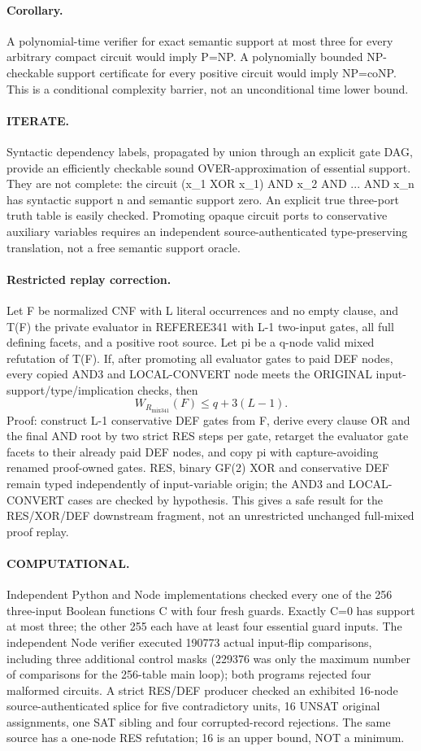 \documentclass[11pt]{article}
\begin{document}
\paragraph{Corollary.} A polynomial-time verifier for exact semantic support at most three for every arbitrary compact circuit would imply P=NP. A polynomially bounded NP-checkable support certificate for every positive circuit would imply NP=coNP. This is a conditional complexity barrier, not an unconditional time lower bound.
\paragraph{ITERATE.} Syntactic dependency labels, propagated by union through an explicit gate DAG, provide an efficiently checkable sound OVER-approximation of essential support. They are not complete: the circuit (x_1 XOR x_1) AND x_2 AND ... AND x_n has syntactic support n and semantic support zero. An explicit true three-port truth table is easily checked. Promoting opaque circuit ports to conservative auxiliary variables requires an independent source-authenticated type-preserving translation, not a free semantic support oracle.
\paragraph{Restricted replay correction.} Let F be normalized CNF with L literal occurrences and no empty clause, and T(F) the private evaluator in REFEREE341 with L-1 two-input gates, all full defining facets, and a positive root source. Let pi be a q-node valid mixed refutation of T(F). If, after promoting all evaluator gates to paid DEF nodes, every copied AND3 and LOCAL-CONVERT node meets the ORIGINAL input-support/type/implication checks, then
\[
W_{R_{\mathrm{mix341}}}(F)\le q+3(L-1).
\]
Proof: construct L-1 conservative DEF gates from F, derive every clause OR and the final AND root by two strict RES steps per gate, retarget the evaluator gate facets to their already paid DEF nodes, and copy pi with capture-avoiding renamed proof-owned gates. RES, binary GF(2) XOR and conservative DEF remain typed independently of input-variable origin; the AND3 and LOCAL-CONVERT cases are checked by hypothesis. This gives a safe result for the RES/XOR/DEF downstream fragment, not an unrestricted unchanged full-mixed proof replay.
\paragraph{COMPUTATIONAL.} Independent Python and Node implementations checked every one of the 256 three-input Boolean functions C with four fresh guards. Exactly C=0 has support at most three; the other 255 each have at least four essential guard inputs. The independent Node verifier executed 190773 actual input-flip comparisons, including three additional control masks (229376 was only the maximum number of comparisons for the 256-table main loop); both programs rejected four malformed circuits. A strict RES/DEF producer checked an exhibited 16-node source-authenticated splice for five contradictory units, 16 UNSAT original assignments, one SAT sibling and four corrupted-record rejections. The same source has a one-node RES refutation; 16 is an upper bound, NOT a minimum.
\end{document}
